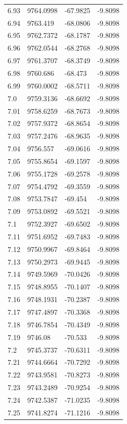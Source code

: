 \begin{table}[H]
\begin{tabular}{llll}
6.93 & 9764.0998 & -67.9825 & -9.8098 \\
6.94 & 9763.419 & -68.0806 & -9.8098 \\
6.95 & 9762.7372 & -68.1787 & -9.8098 \\
6.96 & 9762.0544 & -68.2768 & -9.8098 \\
6.97 & 9761.3707 & -68.3749 & -9.8098 \\
6.98 & 9760.686 & -68.473 & -9.8098 \\
6.99 & 9760.0002 & -68.5711 & -9.8098 \\
7.0 & 9759.3136 & -68.6692 & -9.8098 \\
7.01 & 9758.6259 & -68.7673 & -9.8098 \\
7.02 & 9757.9372 & -68.8654 & -9.8098 \\
7.03 & 9757.2476 & -68.9635 & -9.8098 \\
7.04 & 9756.557 & -69.0616 & -9.8098 \\
7.05 & 9755.8654 & -69.1597 & -9.8098 \\
7.06 & 9755.1728 & -69.2578 & -9.8098 \\
7.07 & 9754.4792 & -69.3559 & -9.8098 \\
7.08 & 9753.7847 & -69.454 & -9.8098 \\
7.09 & 9753.0892 & -69.5521 & -9.8098 \\
7.1 & 9752.3927 & -69.6502 & -9.8098 \\
7.11 & 9751.6952 & -69.7483 & -9.8098 \\
7.12 & 9750.9967 & -69.8464 & -9.8098 \\
7.13 & 9750.2973 & -69.9445 & -9.8098 \\
7.14 & 9749.5969 & -70.0426 & -9.8098 \\
7.15 & 9748.8955 & -70.1407 & -9.8098 \\
7.16 & 9748.1931 & -70.2387 & -9.8098 \\
7.17 & 9747.4897 & -70.3368 & -9.8098 \\
7.18 & 9746.7854 & -70.4349 & -9.8098 \\
7.19 & 9746.08 & -70.533 & -9.8098 \\
7.2 & 9745.3737 & -70.6311 & -9.8098 \\
7.21 & 9744.6664 & -70.7292 & -9.8098 \\
7.22 & 9743.9581 & -70.8273 & -9.8098 \\
7.23 & 9743.2489 & -70.9254 & -9.8098 \\
7.24 & 9742.5387 & -71.0235 & -9.8098 \\
7.25 & 9741.8274 & -71.1216 & -9.8098 \\

\end{tabular}
\end{table}
